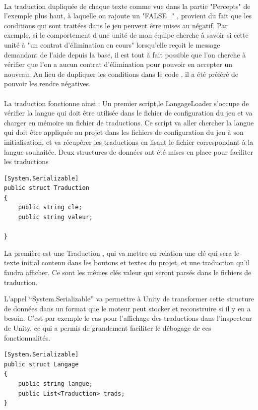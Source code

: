 \documentclass{report}
\begin{document}
\paragraph{}

La traduction dupliquée de chaque texte comme vue dans la partie "Percepts" de l'exemple plus haut, à laquelle on rajoute un "FALSE\_" , provient du fait que les conditions qui sont traitées dans le jeu peuvent être mises au négatif. Par exemple, si le comportement d'une unité de mon équipe cherche à savoir si cette unité à "un contrat d'élimination en cours" lorsqu'elle reçoit le message demandant de l'aide depuis la base, il est tout à fait possible que l'on cherche à vérifier que l'on a aucun contrat d'élimination pour pouvoir en accepter un nouveau.
Au lieu de dupliquer les conditions dans le code , il a été préféré de pouvoir les rendre négatives.
\paragraph{}
La traduction fonctionne ainsi :
Un premier script,le LangageLoader s'occupe de vérifier la langue qui doit être utilisée dans le fichier de configuration du jeu et va charger en mémoire un fichier  de traductions.
Ce script va aller chercher la langue qui doit être appliquée au projet dans les fichiers de configuration du jeu à son initialisation, et va récupérer les traductions en lisant le fichier correspondant à la langue souhaitée. 
Deux structures de données ont été mises en place pour faciliter les traductions 
\begin{lstlisting}[frame=single]
[System.Serializable]
public struct Traduction
{
    public string cle;
    public string valeur;

}
\end{lstlisting}

La première est une Traduction , qui va mettre en relation une clé qui sera le texte initial contenu dans les boutons et textes du projet, et une traduction qu’il faudra afficher. Ce sont les mêmes clés valeur qui seront parsés dans le fichiers de traduction. 

L’appel “System.Serializable” va permettre à Unity de transformer cette structure de données dans un format que le moteur peut stocker et reconstruire si il y en a besoin. C’est par exemple le cas pour l’affichage des traductions dans l’inspecteur de Unity, ce qui a permis de grandement faciliter le débogage de ces fonctionnalités. 


\begin{lstlisting}[frame=single]
[System.Serializable]
public struct Langage
{
    public string langue;
    public List<Traduction> trads;
}
\end{lstlisting}
\end{document}
